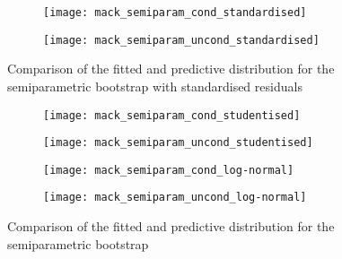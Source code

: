 \documentclass[a4paper]{book}
\begin{document}
\begin{figure}[!p]
  \begin{subfigure}{0.45 \textwidth}
    \texttt{[image: mack\_semiparam\_cond\_standardised]}
  \end{subfigure}
  \begin{subfigure}{0.45 \textwidth}
    \texttt{[image: mack\_semiparam\_uncond\_standardised]}
  \end{subfigure}
  \caption{Comparison of the fitted and predictive distribution for the semiparametric bootstrap with standardised residuals}
  \label{fig:fit-pred-semiparam-standard}
\end{figure}

\begin{landscape}
  \begin{figure}
    \centering
    \begin{subfigure}{0.45\linewidth}
      \texttt{[image: mack\_semiparam\_cond\_studentised]}
    \end{subfigure}
    \begin{subfigure}{0.45\linewidth}
      \texttt{[image: mack\_semiparam\_uncond\_studentised]}
    \end{subfigure}
    \begin{subfigure}{0.45\linewidth}
      \texttt{[image: mack\_semiparam\_cond\_log-normal]}
    \end{subfigure}
    \begin{subfigure}{0.45\linewidth}
      \texttt{[image: mack\_semiparam\_uncond\_log-normal]}
    \end{subfigure}
    \caption{Comparison of the fitted and predictive distribution for the semiparametric bootstrap}
    \label{fig:fit-pred-semiparam-student-log-normal}
  \end{figure}
\end{landscape}
\end{document}
